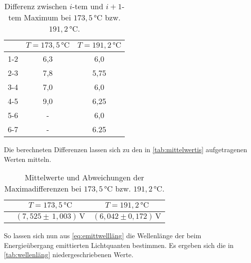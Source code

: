 \begin{table}[H]
    \centering
    \caption{Differenz zwischen $i$-tem und $i + 1$-tem Maximum bei $173,5 \,\unit{\celsius}$ bzw. $191,2 \,\unit{\celsius}$.}
    \label{tab:messung2diffs}
    \begin{tabular}{S[table-format = 1.1] S[table-format = 2.3] S[table-format = 2.3]}
      \toprule
      {} & {$T = 173,5 \,\unit{\celsius}$} & {$T = 191,2 \,\unit{\celsius}$}\\
      \midrule
        {1-2}               &           {6,3}           &           {6,0}              \\
        {2-3}               &           {7,8}           &           {5,75}           \\
        {3-4}               &           {7,0}           &           {6,0}            \\
        {4-5}               &           {9,0}           &           {6,25}           \\
        {5-6}               &           {-}             &           {6,0}            \\
        {6-7}               &           {-}             &           {6.25}           \\
      \bottomrule
    \end{tabular}
\end{table}

Die berechneten Differenzen lassen sich zu den in \autoref{tab:mittelwertis} aufgetragenen Werten mitteln.

\begin{table}[H]
    \centering
    \caption{Mittelwerte und Abweichungen der Maximadifferenzen bei $173,5 \,\unit{\celsius}$ bzw. $191,2 \,\unit{\celsius}$.}
    \label{tab:mittelwertis}
    \begin{tabular}{S[table-format = 1.1] S[table-format = 2.3] S[table-format = 2.3]}
      \toprule
      {} & {$T = 173,5 \,\unit{\celsius}$} & {$T = 191,2 \,\unit{\celsius}$}\\
      \midrule
        {}      & {$ \left( 7,525 \pm \, 1,003\right) \, \unit{\volt}$} & {$ \left(6,042 \pm 0,172 \right)\, \unit{\volt}$}\\
      \bottomrule
    \end{tabular}
\end{table}

So lassen sich nun aus \eqref{eq:emittwellläng} die Wellenlänge der beim Energieübergang emittierten Lichtquanten bestimmen.
Es ergeben sich die in \autoref{tab:wellenläng} niedergeschriebenen Werte.

